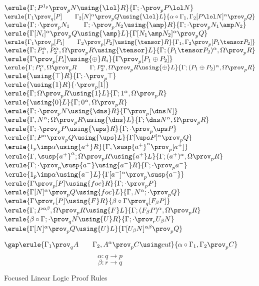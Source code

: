 \def\provp{\prov_p}
\def\provq{\prov_q}
\begin{figure}
\begin{center}
\footnotesize
{}
$
\erule
{\Gamma; P^{1_p} \provp  N \using {\lol}R}
{\Gamma; \cdot \provp P \lol N}
$
\gap
$
\erule
{\Gamma_1 \provq [P] \qquad \Gamma_2[N]^\alpha \provp Q \using {\lol}L}
{\alpha \circ \Gamma_1,\Gamma_2 [P \lol N]^\alpha \provp Q}
$
\gap
$
\erule
{\Gamma;\cdot\provp N_1  \qquad \Gamma;\cdot\provp N_2 \using {\amp}R}
{\Gamma;\cdot\provp N_1\amp N_2 }
$
\gap
$
\erule
{\Gamma [N_i]^\alpha \provp Q \using {\amp}L}
{\Gamma [N_1 \amp N_2]^\alpha \provp Q}
$
\gap
$
\erule
{\Gamma_1 \provp [P_1] \qquad \Gamma_2 \provp [P_2]\using {\tensor}R}
{\Gamma_1, \Gamma_2  \provp [P_1 \tensor P_2]}
$
\gap
$
\erule
{\Gamma; P_1^\alpha, P_2^\alpha, \Omega \provp R \using {\tensor}L}
{\Gamma; (P_1\tensor P_2)^\alpha, \Omega  \provp  R}
$
\gap
$
\erule
{\Gamma \provp [P_i] \using {\oplus}R_i}
{\Gamma  \provp [P_1 \oplus P_2]}
$
\gap
$
\erule
{\Gamma; P_1^\alpha, \Omega \provp R \qquad \Gamma; P_2^\alpha, \Omega \provp R\using {\oplus}L}
{\Gamma; (P_1\oplus P_2)^\alpha, \Omega \provp R}
$
\gap
$
\erule
{\using {\top}R}
{\Gamma;\cdot  \provp \top}
$
\gap
$
\erule
{\using {1}R}
{\cdot  \provp [1]}
$
\gap
$
\erule
{\Gamma; \Omega \provp R \using {1}L}
{\Gamma; 1^\alpha, \Omega \provp R}
$
\gap
$
\erule
{\using {0}L}
{\Gamma; 0^\alpha, \Omega \provp R}
$
\gap
$
\erule
{\Gamma;\cdot \provp N\using {\dns}R}
{\Gamma  \provp [\dns N]}
$
\gap
$
\erule
{\Gamma, N^\alpha; \Omega \provp R \using {\dns}L}
{\Gamma; \dns N^\alpha,  \Omega \provp R}
$
\gap
$
\erule
{\Gamma; \cdot \provp P\using {\ups}R}
{\Gamma; \cdot  \provp \ups P}
$
\gap
$
\erule
{\Gamma; P^\alpha\provp Q \using {\ups}L}
{\Gamma[\ups P]^\alpha \provp Q}
$
\gap
$
\erule
{1_p \imp \alpha \using {a^+}R}
{\Gamma, \susp{a^+}^\alpha  \provp [a^+ ]}
$
\gap
$
\erule
{\Gamma, \susp{a^+}^\alpha; \Omega\provp R \using {a^+}L}
{\Gamma;  (a^+)^\alpha, \Omega  \provp R}
$
\gap
$
\erule
{\Gamma; \cdot \provp \susp{a^-}\using {a^-}R}
{\Gamma; \cdot  \provp a^-}
$
\gap
$
\erule
{1_p \imp \alpha \using {a^-}L }
{\Gamma[a^-]^\alpha \provp \susp{a^-}}
$
\break
$
\erule
{\Gamma \provp [P]\using {foc}R}
{\Gamma;\cdot  \provp P}
$
\gap
$
\erule
{\Gamma[N]^\alpha \provp Q\using {foc}L}
{\Gamma,N^\alpha;\cdot  \provp Q}
$
\break
$
\erule
{\Gamma \prov_r [P]\using {F}R}
{\beta \circ \Gamma  \provq [F_\beta P]}
$
\gap
$
\erule
{\Gamma; P^{\alpha\beta}, \Omega  \provp R\using {F}L}
{\Gamma;(F_\beta P)^\alpha, \Omega  \provp R}
$
\break
$
\erule
{ \beta \circ \Gamma;\cdot\provq N \using {U}R}
{\Gamma;\cdot\prov_r U_\beta N }
$
\gap
$
\erule
{\Gamma [N]^\alpha \provp Q \using {U}L}
{\Gamma [U_\beta N]^{\alpha\beta} \provp Q}
$
\end{center}
$$
\gap
\erule
{\Gamma_1 \prov_q A \qquad \Gamma_2, A^\alpha \prov_p C\using cut}
{\alpha \circ \Gamma_1, \Gamma_2 \prov_p C}
$$
$$\alpha : q \to p$$
$$\beta : r \to q$$
\caption{Focused Linear Logic Proof Rules \label{foc-rules}}
\end{figure}
